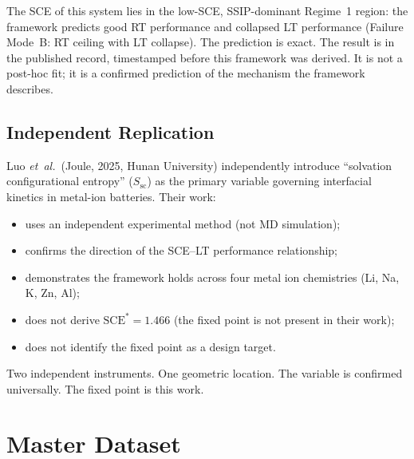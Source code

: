 \documentclass[11pt]{article}
\theoremstyle{plain}
\theoremstyle{definition}
\theoremstyle{remark}
\begin{document}
The SCE of this system lies in the low-SCE, SSIP-dominant Regime~1 region:
the framework predicts good RT performance and collapsed LT performance
(Failure Mode~B: RT ceiling with LT collapse).  The prediction is exact.
The result is in the published record, timestamped before this framework
was derived.  It is not a post-hoc fit; it is a confirmed prediction of
the mechanism the framework describes.

\subsection{Independent Replication}

Luo \textit{et~al.}\ (Joule, 2025, Hunan University) independently introduce
``solvation configurational entropy'' ($S_\mathrm{sc}$) as the primary variable
governing interfacial kinetics in metal-ion batteries.  Their work:
\begin{itemize}[leftmargin=2em]
  \item uses an independent experimental method (not MD simulation);
  \item confirms the direction of the SCE--LT performance relationship;
  \item demonstrates the framework holds across four metal ion chemistries
        (Li, Na, K, Zn, Al);
  \item does not derive $\mathrm{SCE}^{*} = 1.466$ (the fixed point is not
        present in their work);
  \item does not identify the fixed point as a design target.
\end{itemize}
Two independent instruments. One geometric location.
The variable is confirmed universally. The fixed point is this work.

\section{Master Dataset}
\end{document}
